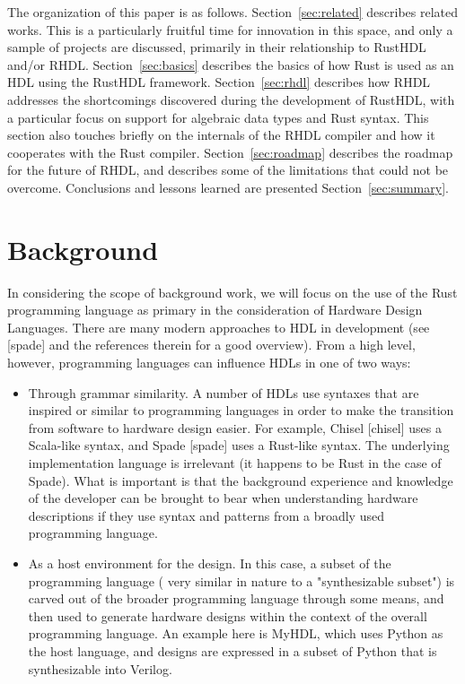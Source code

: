 \documentclass[conference]{IEEEtran}
\begin{document}
The organization of this paper is as follows.  Section~\ref{sec:related} describes related
works.  This is a particularly fruitful time for innovation in this space, and only a
sample of projects are discussed, primarily in their relationship to RustHDL and/or RHDL.
Section~\ref{sec:basics} describes the basics of how Rust is used as an HDL using the RustHDL
framework.  Section~\ref{sec:rhdl} describes how RHDL addresses the shortcomings discovered
during the development of RustHDL, with a particular focus on support for algebraic data types
and Rust syntax.  This section also touches briefly on the internals of the RHDL compiler and
how it cooperates with the Rust compiler.  Section~\ref{sec:roadmap} describes the roadmap for
the future of RHDL, and describes some of the limitations that could not be overcome.  Conclusions
and lessons learned are presented Section~\ref{sec:summary}.

\section{Background}

In considering the scope of background work, we will focus on the use of the Rust programming
language as primary in the consideration of Hardware Design Languages.  There are many modern
approaches to HDL in development (see [spade] and the references therein for a good overview).  
From a high level, however, programming languages can influence HDLs in one of two ways:

\begin{itemize}
  \item Through grammar similarity.  A number of HDLs use syntaxes that are inspired or similar to
  programming languages in order to make the transition from software to hardware design easier.
  For example, Chisel [chisel] uses a Scala-like syntax, and Spade [spade] uses a Rust-like syntax.
  The underlying implementation language is irrelevant (it happens to be Rust in the case of Spade).
  What is important is that the background experience and knowledge of the developer can be brought 
  to bear when understanding hardware descriptions if they use syntax and patterns from a broadly
  used programming language.
  \item As a host environment for the design.  In this case, a subset of the programming language (
    very similar in nature to a "synthesizable subset") is carved out of the broader programming language
    through some means, and then used to generate hardware designs within the context of the overall
    programming language.  An example here is MyHDL, which uses Python as the host language, and 
    designs are expressed in a subset of Python that is synthesizable into Verilog.
\end{itemize}
\end{document}
